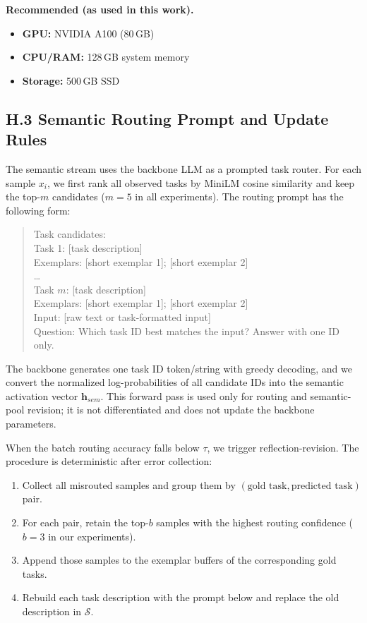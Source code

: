 \documentclass[11pt]{article}
\begin{document}
\textbf{Recommended (as used in this work).}
\begin{itemize}
    \item \textbf{GPU:} NVIDIA A100 (80\,GB)
    \item \textbf{CPU/RAM:} 128\,GB system memory
    \item \textbf{Storage:} 500\,GB SSD
\end{itemize}

\subsection*{H.3 Semantic Routing Prompt and Update Rules}

The semantic stream uses the backbone LLM as a prompted task router. For each sample $x_i$, we first rank all observed tasks by MiniLM cosine similarity and keep the top-$m$ candidates ($m=5$ in all experiments). The routing prompt has the following form:

\begin{quote}
Task candidates:\\
Task 1: [task description]\\
Exemplars: [short exemplar 1]; [short exemplar 2]\\
\ldots\\
Task $m$: [task description]\\
Exemplars: [short exemplar 1]; [short exemplar 2]\\

Input: [raw text or task-formatted input]\\
Question: Which task ID best matches the input? Answer with one ID only.
\end{quote}

The backbone generates one task ID token/string with greedy decoding, and we convert the normalized log-probabilities of all candidate IDs into the semantic activation vector $\mathbf{h}_{sem}$. This forward pass is used only for routing and semantic-pool revision; it is not differentiated and does not update the backbone parameters.

When the batch routing accuracy falls below $\tau$, we trigger reflection-revision. The procedure is deterministic after error collection:
\begin{enumerate}
    \item Collect all misrouted samples and group them by $(\text{gold task}, \text{predicted task})$ pair.
    \item For each pair, retain the top-$b$ samples with the highest routing confidence ($b=3$ in our experiments).
    \item Append those samples to the exemplar buffers of the corresponding gold tasks.
    \item Rebuild each task description with the prompt below and replace the old description in $\mathcal{S}$.
\end{enumerate}
\end{document}
